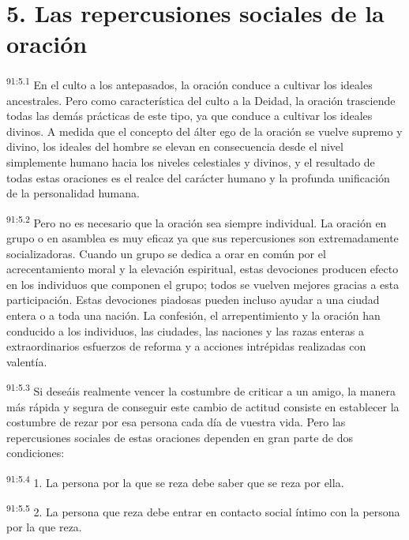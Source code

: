 \documentclass[twoside, 11pt]{book}
\begin{document}
\section*{5. Las repercusiones sociales de la oración}
\par
\textsuperscript{91:5.1} En el culto a los antepasados, la oración conduce a cultivar los ideales ancestrales. Pero como característica del culto a la Deidad, la oración trasciende todas las demás prácticas de este tipo, ya que conduce a cultivar los ideales divinos. A medida que el concepto del álter ego de la oración se vuelve supremo y divino, los ideales del hombre se elevan en consecuencia desde el nivel simplemente humano hacia los niveles celestiales y divinos, y el resultado de todas estas oraciones es el realce del carácter humano y la profunda unificación de la personalidad humana.

\par
\textsuperscript{91:5.2} Pero no es necesario que la oración sea siempre individual. La oración en grupo o en asamblea es muy eficaz ya que sus repercusiones son extremadamente socializadoras. Cuando un grupo se dedica a orar en común por el acrecentamiento moral y la elevación espiritual, estas devociones producen efecto en los individuos que componen el grupo; todos se vuelven mejores gracias a esta participación. Estas devociones piadosas pueden incluso ayudar a una ciudad entera o a toda una nación. La confesión, el arrepentimiento y la oración han conducido a los individuos, las ciudades, las naciones y las razas enteras a extraordinarios esfuerzos de reforma y a acciones intrépidas realizadas con valentía.

\par
\textsuperscript{91:5.3} Si deseáis realmente vencer la costumbre de criticar a un amigo, la manera más rápida y segura de conseguir este cambio de actitud consiste en establecer la costumbre de rezar por esa persona cada día de vuestra vida. Pero las repercusiones sociales de estas oraciones dependen en gran parte de dos condiciones:

\par
\textsuperscript{91:5.4} 1. La persona por la que se reza debe saber que se reza por ella.

\par
\textsuperscript{91:5.5} 2. La persona que reza debe entrar en contacto social íntimo con la persona por la que reza.
\end{document}
